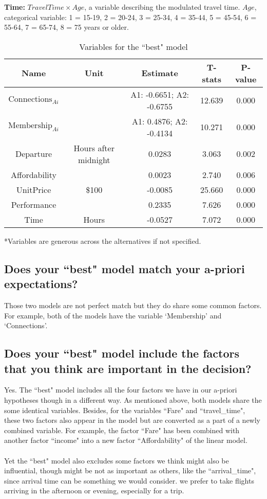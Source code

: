 \documentclass[11pt]{article}
\begin{document}
\textbf{Time:} $TravelTime\times Age$, a variable describing the modulated travel time. $Age$, categorical variable: 1 = 15-19, 2 = 20-24, 3 = 25-34, 4 = 35-44, 5 = 45-54, 6 = 55-64, 7 = 65-74, 8 = 75 years or older.
\begin{table}[H]
	\centering
	\caption{\label{tb:p1var}Variables for the ``best" model}
	\vspace{5pt}
	\begin{tabular}{|c|c|c|c|c|}
		\hline
		Name & \multicolumn{1}{c|}{Unit}  & \multicolumn{1}{c|}{Estimate} & \multicolumn{1}{c|}{T-stats} & \multicolumn{1}{c|}{P-value}\\
		\hline
		$\text{Connections}_{Ai}$ & \diagbox[height=1.2em, width=11em] & A1: -0.6651; A2: -0.6755 & 12.639 & 0.000 \\
		\hline
		$\text{Membership}_{Ai}$ & \diagbox[height=1.2em, width=11em] & A1: 0.4876; A2: -0.4134 & 10.271 & 0.000 \\
		\hline
		Departure & Hours after midnight & 0.0283 & 3.063 & 0.002 \\
		\hline
		Affordability & \diagbox[height=1.2em, width=11em] & 0.0023 & 2.740 & 0.006 \\
		\hline
		UnitPrice & \$100 & -0.0085 & 25.660 & 0.000 \\
		\hline
		Performance & \diagbox[height=1.2em, width=11em] & 0.2335 & 7.626 & 0.000 \\
		\hline
		Time & Hours & -0.0527 & 7.072 & 0.000 \\
		\hline
	\end{tabular}
\end{table}
\vspace{-15pt}
*Variables are generous across the alternatives if not specified.
\subsection{\small{Does your ``best" model match your a-priori expectations?
}}
Those two models are not perfect match but they do share some common factors. For example, both of the models have the variable `Membership' and `Connections'.
\subsection{\small{Does your ``best" model include the factors that you think are important in the decision?
}}
Yes. The ``best" model includes all the four factors we have in our a-priori hypotheses though in a different way. As mentioned above, both models share the some identical variables. Besides, for the variables ``Fare" and ``travel\_time", these two factors also appear in the model but are converted as a part of a newly combined variable. For example, the factor ``Fare" has been combined with another factor ``income" into a new factor ``Affordability" of the linear model.\\\\
Yet the ``best" model also excludes some factors we think might also be influential, though might be not as important as others, like the ``arrival\_time", since arrival time can be something we would consider. we prefer to take flights arriving in the afternoon or evening, especially for a trip.
\end{document}
